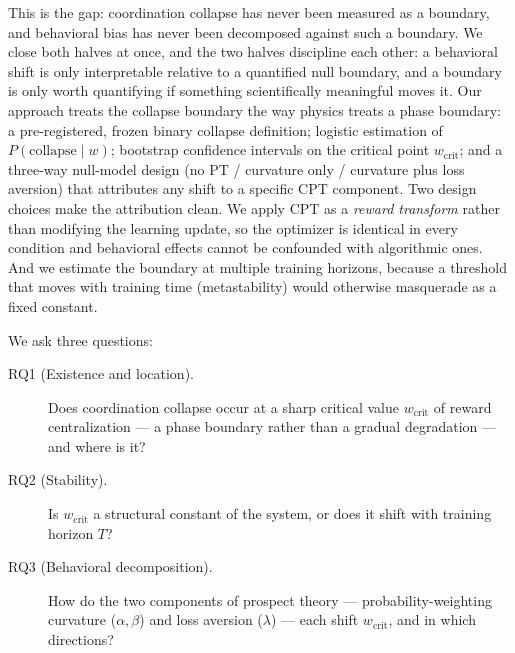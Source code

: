 \documentclass[11pt]{article}
\newcommand{\wcrit}{w_{\mathrm{crit}}}
\begin{document}
This is the gap: coordination collapse has never been measured as a
boundary, and behavioral bias has never been decomposed against such a
boundary.
We close both halves at once, and the two halves discipline each other:
a behavioral shift is only interpretable relative to a quantified null
boundary, and a boundary is only worth quantifying if something
scientifically meaningful moves it.
Our approach treats the collapse boundary the way physics treats a phase
boundary: a pre-registered, frozen binary collapse definition; logistic
estimation of $P(\mathrm{collapse} \mid w)$; bootstrap confidence
intervals on the critical point $\wcrit$; and a three-way null-model
design (no PT / curvature only / curvature plus loss aversion) that
attributes any shift to a specific CPT component.
Two design choices make the attribution clean.
We apply CPT as a \emph{reward transform} rather than modifying the
learning update, so the optimizer is identical in every condition and
behavioral effects cannot be confounded with algorithmic ones.
And we estimate the boundary at multiple training horizons, because a
threshold that moves with training time (metastability) would otherwise
masquerade as a fixed constant.

We ask three questions:
\begin{description}
  \item[RQ1 (Existence and location).] Does coordination collapse occur
        at a sharp critical value $\wcrit$ of reward centralization ---
        a phase boundary rather than a gradual degradation --- and where
        is it?
  \item[RQ2 (Stability).] Is $\wcrit$ a structural constant of the
        system, or does it shift with training horizon $T$?
  \item[RQ3 (Behavioral decomposition).] How do the two components of
        prospect theory --- probability-weighting curvature
        ($\alpha,\beta$) and loss aversion ($\lambda$) --- each shift
        $\wcrit$, and in which directions?
\end{description}
\end{document}
